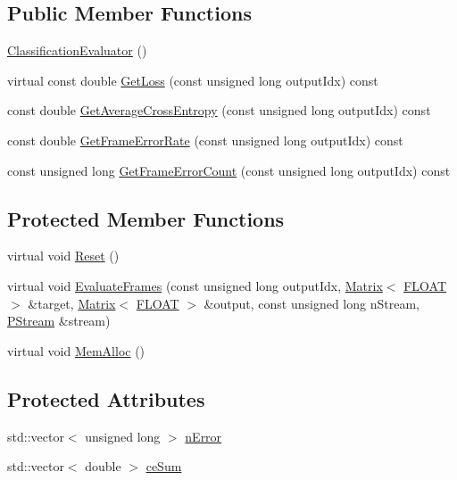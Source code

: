 \subsection*{Public Member Functions}
\begin{DoxyCompactItemize}
\item 
\hyperlink{classfractal_1_1ClassificationEvaluator_a6e0d5eac68626e054431dfc84cedf233}{Classification\+Evaluator} ()
\item 
virtual const double \hyperlink{classfractal_1_1ClassificationEvaluator_a15e9ad1d3e4c180729dd5bd07d4a6b78}{Get\+Loss} (const unsigned long output\+Idx) const 
\item 
const double \hyperlink{classfractal_1_1ClassificationEvaluator_ae0a157cb226de16be62a90491a3986c4}{Get\+Average\+Cross\+Entropy} (const unsigned long output\+Idx) const 
\item 
const double \hyperlink{classfractal_1_1ClassificationEvaluator_a07b4148d558449577463703022c4959a}{Get\+Frame\+Error\+Rate} (const unsigned long output\+Idx) const 
\item 
const unsigned long \hyperlink{classfractal_1_1ClassificationEvaluator_a4345f14ad53a36abe05627cb83c1a367}{Get\+Frame\+Error\+Count} (const unsigned long output\+Idx) const 
\end{DoxyCompactItemize}
\subsection*{Protected Member Functions}
\begin{DoxyCompactItemize}
\item 
virtual void \hyperlink{classfractal_1_1ClassificationEvaluator_a5bb2747a1915e12e6e0eec31fd857b84}{Reset} ()
\item 
virtual void \hyperlink{classfractal_1_1ClassificationEvaluator_a75e22cc1abbbeb16aa4d3e700fbe182c}{Evaluate\+Frames} (const unsigned long output\+Idx, \hyperlink{classfractal_1_1Matrix}{Matrix}$<$ \hyperlink{namespacefractal_a1c2d2530689575d5ccb56bae52af70d3}{F\+L\+O\+A\+T} $>$ \&target, \hyperlink{classfractal_1_1Matrix}{Matrix}$<$ \hyperlink{namespacefractal_a1c2d2530689575d5ccb56bae52af70d3}{F\+L\+O\+A\+T} $>$ \&output, const unsigned long n\+Stream, \hyperlink{classfractal_1_1PStream}{P\+Stream} \&stream)
\item 
virtual void \hyperlink{classfractal_1_1ClassificationEvaluator_aed4e92ea92c89ba01dd12cdde7215e70}{Mem\+Alloc} ()
\end{DoxyCompactItemize}
\subsection*{Protected Attributes}
\begin{DoxyCompactItemize}
\item 
std\+::vector$<$ unsigned long $>$ \hyperlink{classfractal_1_1ClassificationEvaluator_a3881e87f040fa426adb3f6e26d167b8b}{n\+Error}
\item 
std\+::vector$<$ double $>$ \hyperlink{classfractal_1_1ClassificationEvaluator_abea071ea947237bc9db18378509a1094}{ce\+Sum}
\end{DoxyCompactItemize}
